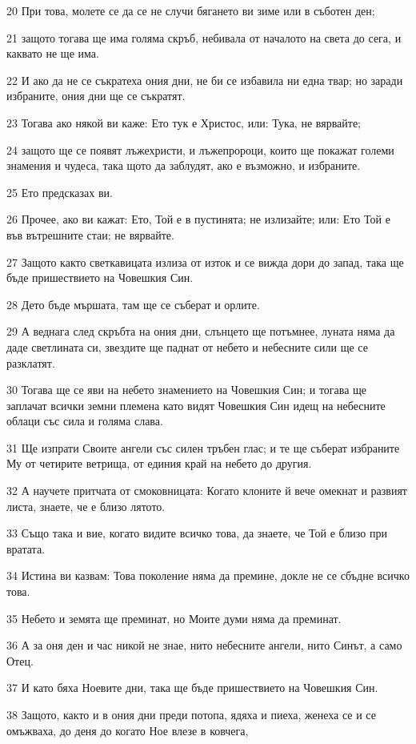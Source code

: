 \par 20 При това, молете се да се не случи бягането ви зиме или в съботен ден;
\par 21 защото тогава ще има голяма скръб, небивала от началото на света до сега, и каквато не ще има.
\par 22 И ако да не се съкратеха ония дни, не би се избавила ни една твар; но заради избраните, ония дни ще се съкратят.
\par 23 Тогава ако някой ви каже: Ето тук е Христос, или: Тука, не вярвайте;
\par 24 защото ще се появят лъжехристи, и лъжепророци, които ще покажат големи знамения и чудеса, така щото да заблудят, ако е възможно, и избраните.
\par 25 Ето предсказах ви.
\par 26 Прочее, ако ви кажат: Ето, Той е в пустинята; не излизайте; или: Ето Той е във вътрешните стаи; не вярвайте.
\par 27 Защото както светкавицата излиза от изток и се вижда дори до запад, така ще бъде пришествието на Човешкия Син.
\par 28 Дето бъде мършата, там ще се съберат и орлите.
\par 29 А веднага след скръбта на ония дни, слънцето ще потъмнее, луната няма да даде светлината си, звездите ще паднат от небето и небесните сили ще се разклатят.
\par 30 Тогава ще се яви на небето знамението на Човешкия Син; и тогава ще заплачат всички земни племена като видят Човешкия Син идещ на небесните облаци със сила и голяма слава.
\par 31 Ще изпрати Своите ангели със силен тръбен глас; и те ще съберат избраните Му от четирите ветрища, от единия край на небето до другия.
\par 32 А научете притчата от смоковницата: Когато клоните й вече омекнат и развият листа, знаете, че е близо лятото.
\par 33 Също така и вие, когато видите всичко това, да знаете, че Той е близо при вратата.
\par 34 Истина ви казвам: Това поколение няма да премине, докле не се сбъдне всичко това.
\par 35 Небето и земята ще преминат, но Моите думи няма да преминат.
\par 36 А за оня ден и час никой не знае, нито небесните ангели, нито Синът, а само Отец.
\par 37 И като бяха Ноевите дни, така ще бъде пришествието на Човешкия Син.
\par 38 Защото, както и в ония дни преди потопа, ядяха и пиеха, женеха се и се омъжваха, до деня до когато Ное влезе в ковчега,
